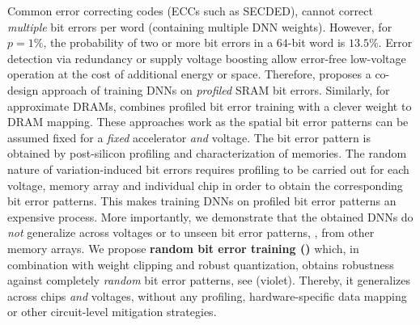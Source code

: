 Common error correcting codes (ECCs such as SECDED), cannot correct \emph{multiple} bit errors per word (containing multiple DNN weights). However, for $p = 1\%$, the probability of two or more bit errors in a $64$-bit word is $13.5\%$.
Error detection via redundancy \cite{ReagenISCA2016} or supply voltage boosting \cite{ChandramoorthyHPCA2019} allow error-free low-voltage operation at the cost of additional energy or space. Therefore, \cite{KimDATE2018} proposes a co-design approach of training DNNs on \emph{profiled} SRAM bit errors. Similarly, for approximate DRAMs, \cite{KoppulaMICRO2019} combines profiled bit error training with a clever weight to DRAM mapping. These approaches work as the spatial bit error patterns can be assumed fixed for a \emph{fixed} accelerator \emph{and} voltage. The bit error pattern is obtained by post-silicon profiling and characterization of memories.
The random nature of variation-induced bit errors requires profiling to be carried out for each voltage, memory array and individual chip in order to obtain the corresponding bit error patterns. This makes training DNNs on profiled bit error patterns an expensive process. More importantly, we demonstrate that the obtained DNNs do \emph{not} generalize across voltages or to unseen bit error patterns, \eg, from other memory arrays. 
We propose \textbf{random bit error training (\Random)} which, in combination with weight clipping and robust quantization, obtains robustness against completely \emph{random} bit error patterns, see   ({\color{colorbrewer4}violet}). Thereby, it generalizes across chips \emph{and} voltages, without any profiling, hardware-specific data mapping or other circuit-level mitigation strategies.

